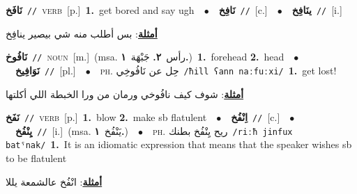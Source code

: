 \documentclass[10pt,a4paper,twoside]{article} %
\begin{document}
\begin{multicols}{2}
{\setlength\topsep{0pt}\textbf{\foreignlanguage{arabic}{نَافَخ}}\ {\color{gray}\texttt{//}\color{black}}\ \textsc{verb}\ [p.]\ \textbf{1.}~get bored and say ugh\ \ $\bullet$\ \ \setlength\topsep{0pt}\textbf{\foreignlanguage{arabic}{نَافِخ}}\ {\color{gray}\texttt{//}\color{black}}\ [c.]\ \ $\bullet$\ \ \setlength\topsep{0pt}\textbf{\foreignlanguage{arabic}{ينَافِخ}}\ {\color{gray}\texttt{//}\color{black}}\ [i.]\  \begin{flushright}\color{gray}\foreignlanguage{arabic}{\textbf{\underline{\foreignlanguage{arabic}{أمثلة}}}: بس أطلب منه شي بيصير ينافِخ}\end{flushright}\color{black}} \vspace{2mm}

{\setlength\topsep{0pt}\textbf{\foreignlanguage{arabic}{نَافُوخ}}\ {\color{gray}\texttt{//}\color{black}}\ \textsc{noun}\ [m.]\ \color{gray}(msa. \foreignlanguage{arabic}{رأس}~\foreignlanguage{arabic}{\textbf{٢.}}  \foreignlanguage{arabic}{جَبْهَة}~\foreignlanguage{arabic}{\textbf{١.}})\color{black}\ \textbf{1.}~forehead  \textbf{2.}~head\ \ $\bullet$\ \ \setlength\topsep{0pt}\textbf{\foreignlanguage{arabic}{نَوَافِيخ}}\ {\color{gray}\texttt{//}\color{black}}\ [pl.]\ \ $\bullet$\ \ \textsc{ph.} \color{gray} \foreignlanguage{arabic}{حِل عن نَافُوخِي}\color{black}\ {\color{gray}\texttt{/{\sffamily ħill ʕann naːfuːxi}/}\color{black}}\ \textbf{1.}~get lost!\  \begin{flushright}\color{gray}\foreignlanguage{arabic}{\textbf{\underline{\foreignlanguage{arabic}{أمثلة}}}: شوف كيف نافُوخي ورمان من ورا الخبطة اللي أكلتها}\end{flushright}\color{black}} \vspace{2mm}

{\setlength\topsep{0pt}\textbf{\foreignlanguage{arabic}{نَفَخ}}\ {\color{gray}\texttt{//}\color{black}}\ \textsc{verb}\ [p.]\ \textbf{1.}~blow  \textbf{2.}~make sb flatulent\ \ $\bullet$\ \ \setlength\topsep{0pt}\textbf{\foreignlanguage{arabic}{اِنْفُخ}}\ {\color{gray}\texttt{//}\color{black}}\ [c.]\ \ $\bullet$\ \ \setlength\topsep{0pt}\textbf{\foreignlanguage{arabic}{يِنْفُخ}}\ {\color{gray}\texttt{//}\color{black}}\ [i.]\ \color{gray}(msa. \foreignlanguage{arabic}{يَنْفُخ}~\foreignlanguage{arabic}{\textbf{١.}})\color{black}\ \ $\bullet$\ \ \textsc{ph.} \color{gray} \foreignlanguage{arabic}{ريح يِنْفُخ بطنك}\color{black}\ {\color{gray}\texttt{/{\sffamily riːħ jinfux batˤnak}/}\color{black}}\ \textbf{1.}~It is an idiomatic expression that means that the speaker wishes sb to be flatulent\  \begin{flushright}\color{gray}\foreignlanguage{arabic}{\textbf{\underline{\foreignlanguage{arabic}{أمثلة}}}: انْفُخ عالشمعة يللا}\end{flushright}\color{black}} \vspace{2mm}


\end{multicols}
\end{document}
